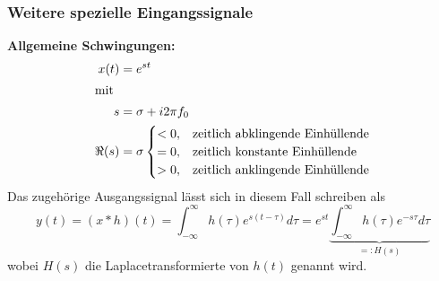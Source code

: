 \subsubsection{Weitere spezielle Eingangssignale}
\textbf{Allgemeine Schwingungen:}
\begin{align*}
    x(t)&=e^{st} \\
    \intertext{mit}
    s&=\sigma + i2\pi f_0 \\
    \Re(s) &= \sigma 
    \begin{cases}
        <0, &\text{zeitlich abklingende Einhüllende}\\
        =0, &\text{zeitlich konstante Einhüllende}\\
        >0, &\text{zeitlich anklingende Einhüllende}
    \end{cases}
\end{align*}
Das zugehörige Ausgangssignal lässt sich in diesem Fall schreiben als
\begin{equation*}
    y(t)=(x*h)(t)=\int_{-\infty}^\infty h(\tau)e^{s(t-\tau)}d\tau=e^{st}\underbrace{\int_{-\infty}^\infty h(\tau)e^{-s\tau}d\tau}_{=:H(s)}
\end{equation*}
wobei $H(s)$ die Laplacetransformierte von $h(t)$ genannt wird.
